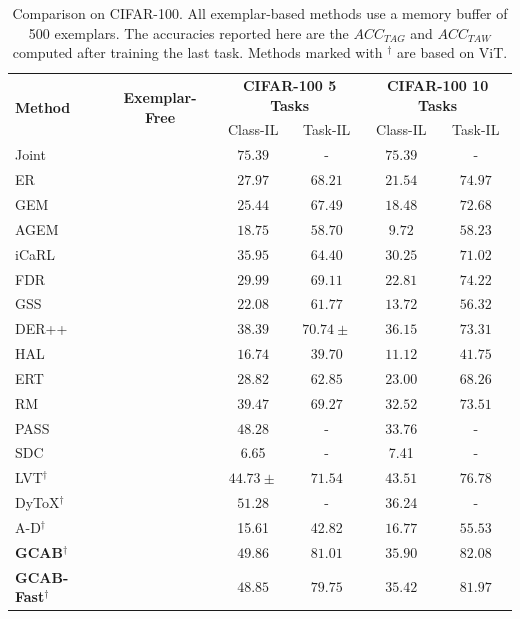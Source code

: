 \documentclass[twocolumn]{svjour3}          %
\newcommand{\cmark}{\ding{51}}%
\newcommand{\xmark}{\ding{55}}%
\begin{document}
\begin{table}[tb]
\centering
  \begin{tabular}{lccccc}
    \hline
    \multirow{2}{*}{\textbf{Method}} 
    &\multirow{2}{*}{\textbf{Exemplar-Free}}
    &\multicolumn{2}{c}{\textbf{CIFAR-100 5 Tasks}}
    &\multicolumn{2}{c}{\textbf{CIFAR-100 10 Tasks}}\\
    & &Class-IL &Task-IL &Class-IL &Task-IL\\
    \hline
    Joint& \cmark& $75.39$ & - & $75.39$ & -\\
    \hline
    ER \hfill \citep{riemer2018learning}   & \xmark&$27.97$& $68.21$& $21.54$& $74.97$\\
    GEM \hfill \citep{lopez2017gradient} & \xmark &$25.44$& $67.49$& $18.48$& $72.68$
    \\
    AGEM \hfill \citep{chaudhry2018efficient} & \xmark &$18.75$ &$58.70$ &$9.72$  &$58.23$ 
     \\
    iCaRL \hfill \citep{rebuffi2017icarl} &\xmark&$35.95$ &$64.40$ &$30.25$ &$71.02$ 
     \\
    FDR \hfill \citep{benjamin2018measuring}  & \xmark &$29.99$ &$69.11$ &$22.81$ &$74.22$ 
     \\
    GSS \hfill \citep{aljundi2019gradient}  & \xmark &$22.08$ &$61.77$ &$13.72$ &$56.32$ 
     \\
    DER++ \hfill \citep{buzzega2020dark} & \xmark &$38.39$ &$70.74±$ &$36.15$ &$73.31$ 
     \\
    HAL \hfill \citep{chaudhry2021using}  & \xmark &$16.74$ &$39.70$ &$11.12$ &$41.75$ 
    \\
    ERT \hfill \citep{buzzega2021rethinking}  & \xmark &$28.82$ &$62.85$ &$23.00$ &$68.26$ 
     \\
    RM \hfill \citep{bang2021rainbow}   &\xmark &$39.47$ &$69.27$ &$32.52$ &$73.51$ 
     \\
    PASS \hfill \citep{zhu2021prototype}
     & \cmark & $48.28$ & - & $33.76$ & -\\
    SDC \hfill \citep{yu2020semantic}
    &  \cmark& 6.65 &-&7.41&-\\
    \hline
    LVT$^{\dag}$ \hfill \citep{wang2022continual} &\xmark &$44.73±$ &$71.54$ &$\mathbf{43.51}$ &$76.78$  
     \\
    DyToX$^{\dag}$ \hfill \citep{douillard2022dytox} &\xmark & $\mathbf{51.28}$ & -  & 36.24 & -  
     \\
    A-D$^{\dag}$ \hfill \citep{pelosin2022towards}
    &  \cmark & 15.61 & 42.82 & $16.77$& $55.53$\\
    \hline
    \textbf{GCAB}$^{\dag}$ & \cmark& $49.86$ & $\mathbf{81.01 }$ & $35.90 $ & $\mathbf{82.08}$ 
    \\
    \textbf{GCAB-Fast}$^{\dag}$ & \cmark & $48.85 $ & $79.75 $ & $35.42$ & $81.97$ 
    \\
    \hline
  \end{tabular}
\caption{Comparison on CIFAR-100. All exemplar-based methods use a memory buffer of 500 exemplars. The accuracies reported here are the $ACC_{TAG}$ and $ACC_{TAW}$ computed after training the last task. Methods marked with $^{\dag}$ are based on ViT.}
\label{tab:500_cifar}
\end{table}
\end{document}
